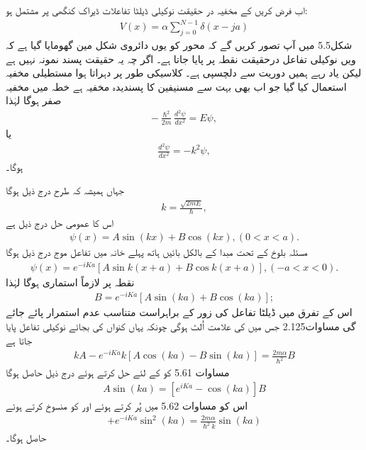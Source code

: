 اب فرض کریں کے مخفیہ در حقیقت نوکیلی ڈیلٹا تفاعلات ڈیراک کنگھی پر مشتمل ہو:
\begin{align}
	V(x) = \alpha\sum_{j=0}^{N-1}\delta(x-ja)
\end{align}
شکل\num{5.5} میں آپ تصور کریں گے  کہ محور  کو یوں دائروی شکل مین گھومایا گیا ہے کہ ویں نوکیلی تفاعل درحقیقت نقطہ   پر پایا جاتا ہے۔ اگر چہ یہ حقیقت پسند نمونہ نہیں ہے لیکن یاد رہے ہمیں دوریت سے دلچسپی ہے۔ کلاسیکی طور پر دہراتا ہوا مستطیلی مخفیہ استعمال کیا گیا جو اب بھی بہت سے مسنیفین کا پسندیدہ مخفیہ ہے خطہ  میں مخفیہ صفر ہوگا لہٰذا 
\begin{align*}
	-\frac{\hslash^{2}}{2m}\frac{d^{2}\psi}{dx^{2}} = E\psi,
\end{align*}
یا
\begin{align*}
	\frac{d^{2}\psi}{dx^{2}} = -k^{2}\psi,
\end{align*}
ہوگا۔

جہاں ہمیشہ کہ طرح درج ذیل ہوگا 
\begin{align}
	k = \frac{\sqrt{2mE}}{\hslash},
\end{align}
اس کا عمومی حل درج ذیل ہے 
\begin{align}
	\psi(x) = A\sin(kx) + B\cos(kx), (0<x<a).
\end{align}
مسئلہ بلوخ کے تحت مبدا کے بالکل بائیں ہاتھ پہلے خانہ میں تفاعل موج درج ذیل ہوگا 
\begin{align}
	\psi(x) = e^{-iKa}[A\sin k(x+a) + B\cos k(x+a)], (-a<x<0). 
\end{align}
نقطہ پر  لازماً استماری ہوگا لہٰذا 
\begin{align}
	B = e^{-iKa}[A\sin(ka) + B\cos(ka)];
\end{align}
اس کے تفرق میں ڈیلٹا تفاعل کی زور کے براہراست متناسب عدم استمرار پائے جائے گی مساوات\num{2.125} جس میں  کی علامت اُلٹ ہوگی چونکہ یہاں کنواں کی بجائے نوکیلی تفاعل پایا جاتا ہے
\begin{align}
	kA - e^{-iKa}k[A\cos(ka) - B\sin(ka)] = \frac{2m\alpha}{\hslash^{2}}B
\end{align}
مساوات \num{5.61} کو  کے لئے حل کرتے ہوئے درج ذیل حاصل ہوگا 
\begin{align}
	A\sin(ka) = [e^{iKa}-\cos(ka)]B
\end{align}
اس کو مساوات \num{5.62} میں پُر کرتے ہوئے اور  کو منسوخ کرتے ہوئے 
\begin{align*}
	[e^{iKa}-\cos(ka)][1-e^{-iKa}\cos(ka)] + e^{-iKa}\sin^{2}(ka) = \frac{2m\alpha}{\hslash^{2}k}\sin(ka)
\end{align*}
حاصل ہوگا۔

